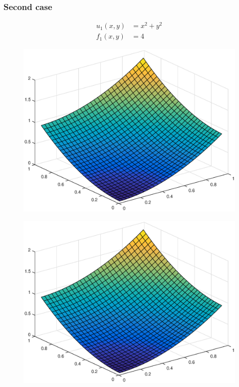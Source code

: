 \documentclass[main.tex]{subfiles}
\begin{document}
\subsubsection*{Second case}
\begin{align}
    u_{1}(x,y) &= x^2 + y^2 \\
    f_1(x,y) &= 4
\end{align}

\begin{figure}[h]
\centering
\begin{minipage}{.5\textwidth}
  \centering
  \includegraphics[width=.9\linewidth]{../Figures/ex2u1exact}
  \label{fig:ex2:u1exact}
\end{minipage}%
\begin{minipage}{.5\textwidth}
  \centering
  \includegraphics[width=.9\linewidth]{../Figures/ex2u1calc}
  \label{fig:ex2:u1calc}
\end{minipage}
\end{figure}
\end{document}
